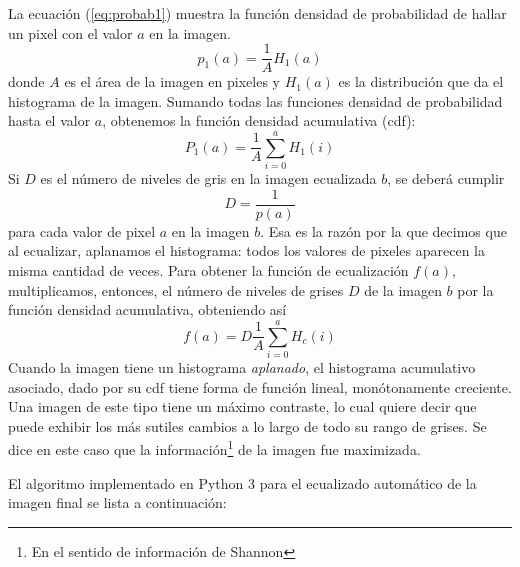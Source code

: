 \documentclass[a4paper, 12pt]{article}
\begin{document}
La ecuación (\ref{eq:probab1}) muestra la función densidad de probabilidad de hallar un pixel con el valor $a$ en la imagen.
\begin{equation}
  \label{eq:probab1}
  p_1(a)=\frac{1}{A} H_1(a)
\end{equation}
donde $A$ es el área de la imagen en pixeles y $H_1(a)$ es la distribución que da el histograma de la imagen. Sumando todas las funciones densidad de probabilidad hasta el valor $a$, obtenemos la función densidad acumulativa (cdf):
\begin{equation}
  \label{eq:cdf}
  P_1(a)=\frac{1}{A} \sum_{i=0}^a H_1(i)
\end{equation}
Si $D$ es el número de niveles de gris en la imagen ecualizada $b$, se deberá cumplir $$D=\frac{1}{p(a)}$$ para cada valor de pixel $a$ en la imagen $b$. Esa es la razón por la que decimos que al ecualizar, aplanamos el histograma: todos los valores de pixeles aparecen la misma cantidad de veces.
Para obtener la función de ecualización $f(a)$, multiplicamos, entonces, el número de niveles de grises $D$ de la imagen $b$ por la función densidad acumulativa, obteniendo así
\begin{equation}
  \label{eq:f}
  f(a)=D\frac{1}{A} \sum_{i=0}^a H_c(i)
\end{equation}
Cuando la imagen tiene un histograma {\it aplanado}, el histograma acumulativo asociado, dado por su cdf tiene forma de función lineal, monótonamente creciente. Una imagen de este tipo tiene un máximo contraste, lo cual quiere decir que puede exhibir los más sutiles cambios a lo largo de todo su rango de grises. Se dice en este caso que la información\footnote{En el sentido de información de Shannon} de la imagen fue maximizada\cite{easton}.

El algoritmo implementado en Python 3 para el ecualizado automático de la imagen final se lista a continuación:


\end{document}
